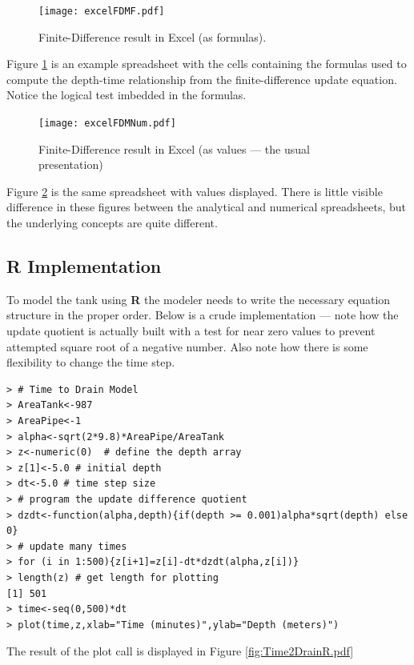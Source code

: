 \documentclass[12pt]{article}
\begin{document}
\begin{figure}[h!] %
   \centering
   \texttt{[image: excelFDMF.pdf]} 
   \caption{Finite-Difference result in Excel (as formulas).}
   \label{fig:excelFDMF}
\end{figure}

Figure \ref{fig:excelFDMF} is an example spreadsheet with the cells containing the formulas used to compute the depth-time relationship from the finite-difference update equation.  Notice the logical test imbedded in the formulas.

\begin{figure}[h!] %
   \centering
   \texttt{[image: excelFDMNum.pdf]} 
   \caption{Finite-Difference result in Excel (as values --- the usual presentation)}
   \label{fig:excelFDMNum}
\end{figure}

Figure \ref{fig:excelFDMNum} is the same spreadsheet with values displayed.  There is little visible difference in these figures between the analytical and numerical spreadsheets, but the underlying concepts are quite different.  

\subsection{\textbf{R} Implementation}
To model the tank using \textbf{R} the modeler needs to write the necessary equation structure in the proper order.  Below is a crude implementation --- note how the update quotient is actually built with a test for near zero values to prevent attempted square root of a negative number.   Also note how there is some flexibility to change the time step.

\begin{verbatim}
> # Time to Drain Model
> AreaTank<-987
> AreaPipe<-1
> alpha<-sqrt(2*9.8)*AreaPipe/AreaTank
> z<-numeric(0)  # define the depth array
> z[1]<-5.0 # initial depth
> dt<-5.0 # time step size
> # program the update difference quotient
> dzdt<-function(alpha,depth){if(depth >= 0.001)alpha*sqrt(depth) else 0}
> # update many times
> for (i in 1:500){z[i+1]=z[i]-dt*dzdt(alpha,z[i])}
> length(z) # get length for plotting
[1] 501
> time<-seq(0,500)*dt
> plot(time,z,xlab="Time (minutes)",ylab="Depth (meters)")
\end{verbatim}

The result of the plot call is displayed in Figure \ref{fig:Time2DrainR.pdf}
\end{document}
